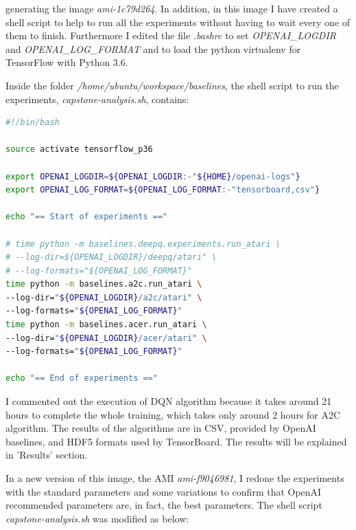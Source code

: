 \documentclass[11pt,twoside,a4paper]{article}
\begin{document}
generating the image \emph{ami-1c79d264}. In addition, in this image I have
created a shell script to help to run all the experiments without having to wait
every one of them to finish. Furthermore I edited the file \emph{.bashrc} to
set \emph{OPENAI\_LOGDIR} and \emph{OPENAI\_LOG\_FORMAT} and to load the
python virtualenv for TensorFlow with Python 3.6.

Inside the folder \textit{/home/ubuntu/workspace/baselines}, the shell script
to run the experiments, \textit{capstone-analysis.sh}, contains:

\begin{lstlisting}[language=bash,caption={bash version}]
#!/bin/bash

source activate tensorflow_p36

export OPENAI_LOGDIR=${OPENAI_LOGDIR:-"${HOME}/openai-logs"}
export OPENAI_LOG_FORMAT=${OPENAI_LOG_FORMAT:-"tensorboard,csv"}

echo "== Start of experiments =="

# time python -m baselines.deepq.experiments.run_atari \
# --log-dir=${OPENAI_LOGDIR}/deepq/atari" \
# --log-formats="${OPENAI_LOG_FORMAT}"
time python -m baselines.a2c.run_atari \
--log-dir="${OPENAI_LOGDIR}/a2c/atari" \
--log-formats="${OPENAI_LOG_FORMAT}"
time python -m baselines.acer.run_atari \
--log-dir="${OPENAI_LOGDIR}/acer/atari" \
--log-formats="${OPENAI_LOG_FORMAT}"

echo "== End of experiments =="
\end{lstlisting}

I commented out the execution of DQN algorithm because it takes around 21 hours
to complete the whole training, which takes only around 2 hours for A2C
algorithm. The results of the algorithms are in CSV, provided by OpenAI
baselines, and HDF5 formats used by TensorBoard. The results will be explained
in 'Results' section.

In a new version of this image, the AMI \emph{ami-f9046981}, I redone the
experiments with the standard parameters and some variations to confirm that
OpenAI recommended parameters are, in fact, the best parameters. The shell
script \textit{capstone-analysis.sh} was modified as below:
\end{document}
